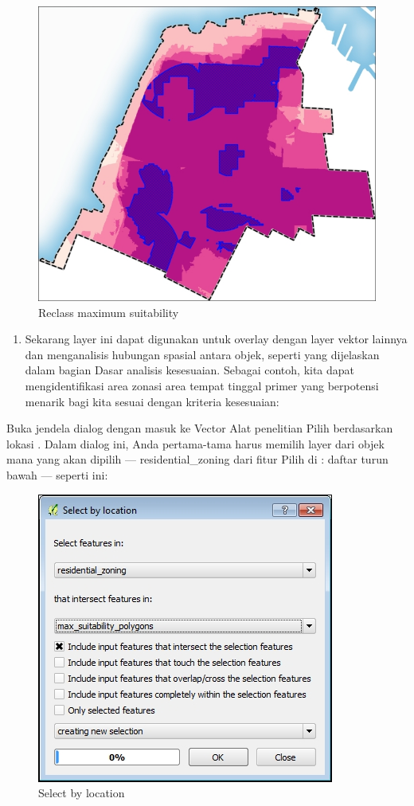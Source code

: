 \documentclass[]{book}
\providecommand{\tightlist}{%
  \setlength{\itemsep}{0pt}\setlength{\parskip}{0pt}}
\begin{document}
\begin{figure}

{\centering \includegraphics[width=0.7\linewidth]{images/04/fig45} 

}

\caption{Reclass maximum suitability}\label{fig:fig1445}
\end{figure}

\begin{enumerate}
\def\labelenumi{\arabic{enumi}.}
\setcounter{enumi}{3}
\tightlist
\item
  Sekarang layer ini dapat digunakan untuk overlay dengan layer vektor lainnya dan menganalisis hubungan spasial antara objek, seperti yang dijelaskan dalam bagian Dasar analisis kesesuaian. Sebagai contoh, kita dapat mengidentifikasi area zonasi area tempat tinggal primer yang berpotensi menarik bagi kita sesuai dengan kriteria kesesuaian:
\end{enumerate}

Buka jendela dialog dengan masuk ke Vector \textbar{} Alat penelitian \textbar{} Pilih berdasarkan lokasi . Dalam dialog ini, Anda pertama-tama harus memilih layer dari objek mana yang akan dipilih --- residential\_zoning dari fitur Pilih di : daftar turun bawah --- seperti ini:

\begin{figure}

{\centering \includegraphics[width=0.6\linewidth]{images/04/fig46} 

}

\caption{Select by location}\label{fig:fig1446}
\end{figure}
\end{document}
